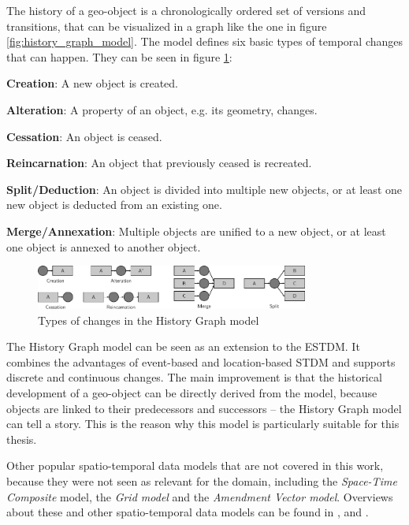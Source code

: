The history of a geo-object is a chronologically ordered set of versions and transitions, that can be visualized in a graph like the one in figure \ref{fig:history_graph_model}.
The model defines six basic types of temporal changes that can happen. They can be seen in figure \ref{fig:history_graph_changes}:

\begin{compactitem}
  \item \textbf{Creation}:           A new object is created.
  \item \textbf{Alteration}:         A property of an object, e.g. its geometry, changes.
  \item \textbf{Cessation}:          An object is ceased.
  \item \textbf{Reincarnation}:      An object that previously ceased is recreated.
  \item \textbf{Split/Deduction}:    An object is divided into multiple new objects, or at least one new object is deducted from an existing one.
  \item \textbf{Merge/Annexation}:   Multiple objects are unified to a new object, or at least one object is annexed to another object.
\end{compactitem}

\begin{figure}[ht]
  \vspace{1em}
  \centering
  \includegraphics[width=0.8\textwidth]{graphics/basics/stdm/history_graph_changes}
  \caption{Types of changes in the History Graph model}
  \label{fig:history_graph_changes}
\end{figure}

The History Graph model can be seen as an extension to the ESTDM. It combines the advantages of event-based and location-based STDM and supports discrete and continuous changes. The main improvement is that the historical development of a geo-object can be directly derived from the model, because objects are linked to their predecessors and successors -- the History Graph model can tell a story. This is the reason why this model is particularly suitable for this thesis.


\vspace{1em}
Other popular spatio-temporal data models that are not covered in this work, because they were not seen as relevant for the domain, including the \emph{Space-Time Composite} model, the \emph{Grid model} and the \emph{Amendment Vector model}. Overviews about these and other spatio-temporal data models can be found in \cite{zhao11}, \cite{pelekis04stdms} and \cite{peuquet99}.

